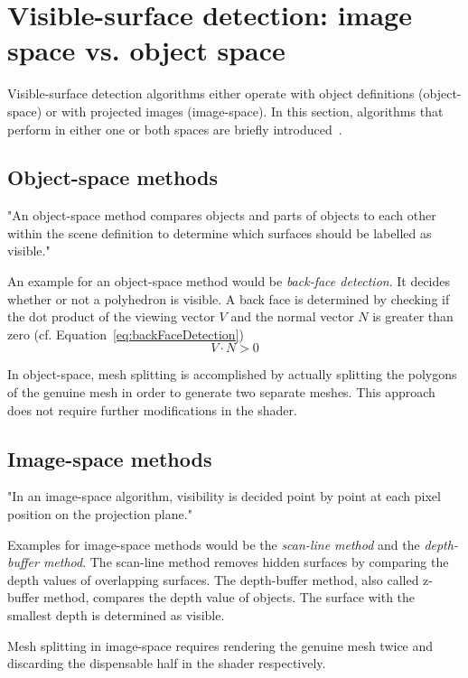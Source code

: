 \section{Visible-surface detection: image space vs. object space}
Visible-surface detection algorithms either operate with object definitions (object-space) or with projected images (image-space). In this section, algorithms that perform in either one or both spaces are briefly introduced~\cite{book:computerGraphicsHearn}.

\subsection{Object-space methods}
"An object-space method compares objects and parts of objects to each other within the scene definition to determine which surfaces should be labelled as visible."~\cite{book:computerGraphicsHearn}

An example for an object-space method would be \emph{back-face detection}. It decides whether or not a polyhedron is visible. A back face is determined by checking if the dot product of the viewing vector $V$ and the normal vector $N$ is greater than zero (cf. Equation~\ref{eq:backFaceDetection})
\begin{equation}
V \cdot N > 0
\label{eq:backFaceDetection}
\end{equation}

In object-space, mesh splitting is accomplished by actually splitting the polygons of the genuine mesh in order to generate two separate meshes. This approach does not require further modifications in the shader.

\subsection{Image-space methods}
"In an image-space algorithm, visibility is decided point by point at each pixel position on the projection plane."~\cite{book:computerGraphicsHearn}

Examples for image-space methods would be the \emph{scan-line method} and the \emph{depth-buffer method}. The scan-line method removes hidden surfaces by comparing the depth values of overlapping surfaces. The depth-buffer method, also called z-buffer method, compares the depth value of objects. The surface with the smallest depth is determined as visible.

Mesh splitting in image-space requires rendering the genuine mesh twice and discarding the dispensable half in the shader respectively.


